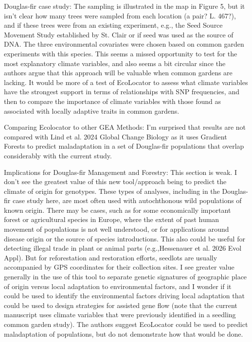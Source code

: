 \begin{point}{} %
Douglas-fir case study: The sampling is illustrated in the map in Figure 5, but it isn't clear how many trees were sampled from each location (a pair? L. 467?), and if these trees were from an existing experiment, e.g., the Seed Source Movement Study established by St. Clair or if seed was used as the source of DNA. The three environmental covariates were chosen based on common garden experiments with this species. This seems a missed opportunity to test for the most explanatory climate variables, and also seems a bit circular since the authors argue that this approach will be valuable when common gardens are lacking. It would be more of a test of EcoLocator to assess what climate variables have the strongest support in terms of relationships with SNP frequencies, and then to compare the importance of climate variables with those found as associated with locally adaptive traits in common gardens.
\end{point}


\begin{point}{} %
Comparing Ecolocator to other GEA Methods: I'm surprised that results are not compared with Lind et al. 2024 Global Change Biology as it uses Gradient Forests to predict maladaptation in a set of Douglas-fir populations that overlap considerably with the current study.
\end{point}


\begin{point}{} %
Implications for Douglas-fir Management and Forestry: This section is weak. I don't see the greatest value of this new tool/approach being to predict the climate of origin for genotypes. These types of analyses, including in the Douglas-fir case study here, are most often used with autochthonous wild populations of known origin. There may be cases, such as for some economically important forest or agricultural species in Europe, where the extent of past human movement of populations is not well understood, or for applications around disease origin or the source of species introductions. This also could be useful for detecting illegal trade in plant or animal parts (e.g.,Hessenauer et al. 2026 Evol Appl). But for reforestation and restoration efforts, seedlots are usually accompanied by GPS coordinates for their collection sites. I see greater value generally in the use of this tool to separate genetic signatures of geographic place of origin versus local adaptation to environmental factors, and I wonder if it could be used to identify the environmental factors driving local adaptation that could be used to design strategies for assisted gene flow (note that the current manuscript uses climate variables that were previously identified in a seedling common garden study). The authors suggest EcoLocator could be used to predict maladaptation of populations, but do not demonstrate how that would be done.
\end{point}

